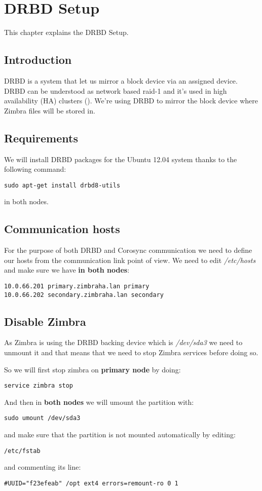 

\chapter{DRBD Setup}
\label{chap:drbd-setup}
This chapter explains the DRBD Setup.

\section {Introduction}
DRBD is a system that let us mirror a block device via an assigned device. DRBD can be understood as network based raid-1 and it's used in high availability (HA) clusters (\cite{LinbitDRBDWhatIs}).
We're using DRBD to mirror the block device where Zimbra files will be stored in.

\section {Requirements}
We will install DRBD packages for the Ubuntu 12.04 system thanks to the following command:
\begin{verbatim}
sudo apt-get install drbd8-utils
\end{verbatim}
in both nodes.
\section {Communication hosts}
For the purpose of both DRBD and Corosync communication we need to define our hosts from the communication link point of view. We need to edit \textit{/etc/hosts} and make sure we have \textbf{in both nodes}:

\begin{verbatim}
10.0.66.201 primary.zimbraha.lan primary
10.0.66.202 secondary.zimbraha.lan secondary
\end{verbatim}

\section {Disable Zimbra}
As Zimbra is using the DRBD backing device which is \textit{/dev/sda3} we need to unmount it and that means that we need to stop Zimbra services before doing so.

So we will first stop zimbra on \textbf{primary node} by doing:
\begin{verbatim}
service zimbra stop
\end{verbatim}

And then in \textbf{both nodes} we will umount the partition with:
\begin{verbatim}
sudo umount /dev/sda3
\end{verbatim}
and make sure that the partition is not mounted automatically by editing:
\begin{verbatim}
/etc/fstab
\end{verbatim}
and commenting its line:
\begin{verbatim}
#UUID="f23efeab" /opt ext4 errors=remount-ro 0 1
\end{verbatim}

